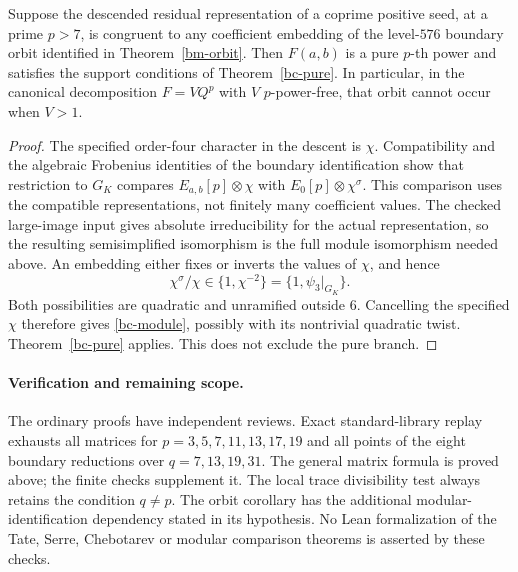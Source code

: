\begin{corollary}\label{bc-orbit}
Suppose the descended residual representation of a coprime positive
seed, at a prime $p>7$, is congruent to any coefficient embedding of
the level-$576$ boundary orbit identified in Theorem~\ref{bm-orbit}.
Then $F(a,b)$ is a pure $p$-th power and satisfies the support
conditions of Theorem~\ref{bc-pure}. In particular, in the canonical
decomposition $F=VQ^p$ with $V$ $p$-power-free, that orbit cannot
occur when $V>1$.
\end{corollary}
\begin{proof}
The specified order-four character in the descent is $\chi$.
Compatibility and the algebraic Frobenius identities of the boundary
identification show that restriction to $G_K$ compares
$E_{a,b}[p]\otimes\chi$ with $E_0[p]\otimes\chi^\sigma$.
This comparison uses the compatible representations, not finitely
many coefficient values. The checked large-image input gives absolute
irreducibility for the actual representation, so the resulting
semisimplified isomorphism is the full module isomorphism needed above.
An embedding either fixes or inverts the values of $\chi$, and hence
\[
 \chi^\sigma/\chi\in\{1,\chi^{-2}\}
       =\{1,\psi_3|_{G_K}\}.
\]
Both possibilities are quadratic and unramified outside $6$.
Cancelling the specified $\chi$ therefore gives
\eqref{bc-module}, possibly with its nontrivial quadratic twist.
Theorem~\ref{bc-pure} applies. This does not exclude the pure branch.
\end{proof}

\paragraph{Verification and remaining scope.}
The ordinary proofs have independent reviews. Exact standard-library
replay exhausts all matrices for $p=3,5,7,11,13,17,19$ and all points
of the eight boundary reductions over $q=7,13,19,31$. The general
matrix formula is proved above; the finite checks supplement it.
The local trace divisibility test always retains the condition $q\ne p$.
The orbit corollary has the additional modular-identification dependency
stated in its hypothesis. No Lean formalization of the Tate, Serre,
Chebotarev or modular comparison theorems is asserted by these checks.
